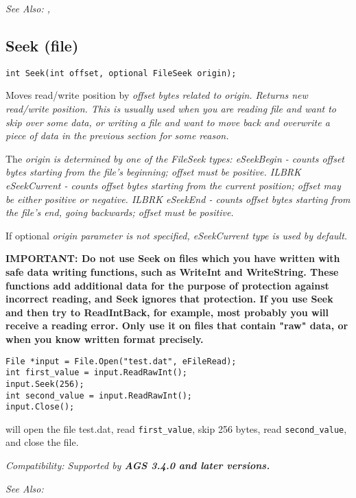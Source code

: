 \it{See Also:} , 


\subsection{Seek (file)}\label{File.Seek}%

\begin{verbatim}
int Seek(int offset, optional FileSeek origin);
\end{verbatim}
Moves read/write position by \it{offset} bytes related to \it{origin}. Returns new read/write position.
This is usually used when you are reading file and want to skip over some data, or writing a file
and want to move back and overwrite a piece of data in the previous section for some reason.

The \it{origin} is determined by one of the FileSeek types:
eSeekBegin - counts \it{offset} bytes starting from the file's beginning; \it{offset} must be positive. ILBRK
eSeekCurrent - counts \it{offset} bytes starting from the current position; \it{offset} may be either
positive or negative. ILBRK
eSeekEnd - counts \it{offset} bytes starting from the file's end, going backwards; \it{offset} must be positive.

If optional \it{origin} parameter is not specified, eSeekCurrent type is used by default.

\bf{IMPORTANT:} Do not use Seek on files which you have written with safe data writing functions,
such as WriteInt and WriteString. These functions add additional data for the purpose of
protection against incorrect reading, and Seek ignores that protection. If you use Seek and then try
to ReadIntBack, for example, most probably you will receive a reading error. Only use it on files
that contain "raw" data, or when you know written format precisely.

\begin{verbatim}
File *input = File.Open("test.dat", eFileRead);
int first_value = input.ReadRawInt();
input.Seek(256);
int second_value = input.ReadRawInt();
input.Close();
\end{verbatim}
will open the file test.dat, read \verb$first_value$, skip 256 bytes, read \verb$second_value$, and close the file.

\it{Compatibility:} Supported by \bf{AGS 3.4.0} and later versions.

\it{See Also:} 


